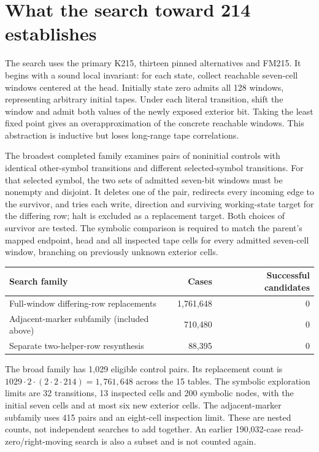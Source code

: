 \documentclass[11pt,a4paper]{article}
\begin{document}


\section{What the search toward 214 establishes}
\label{sec:search}

The search uses the primary K215, thirteen pinned alternatives and FM215.
It begins with a sound local invariant: for each state, collect reachable
seven-cell windows centered at the head. Initially state zero admits all
128 windows, representing arbitrary initial tapes. Under each literal
transition, shift the window and admit both values of the newly exposed
exterior bit. Taking the least fixed point gives an overapproximation of
the concrete reachable windows. This abstraction is inductive but loses
long-range tape correlations.

The broadest completed family examines pairs of noninitial controls with
identical other-symbol transitions and different selected-symbol
transitions. For that selected symbol, the two sets of admitted seven-bit
windows must be nonempty and disjoint. It deletes one of the pair,
redirects every incoming edge to the survivor, and tries each write,
direction and surviving working-state target for the differing row;
halt is excluded as a replacement target. Both choices of survivor are
tested. The symbolic comparison is required to match the parent's
mapped endpoint, head and all inspected tape cells for every admitted
seven-cell window, branching on previously unknown exterior cells.

\begin{center}
\begin{tabular}{lrr}
\toprule
Search family & Cases & Successful candidates\\
\midrule
Full-window differing-row replacements & 1,761,648 & 0\\
Adjacent-marker subfamily (included above) & 710,480 & 0\\
Separate two-helper-row resynthesis & 88,395 & 0\\
\bottomrule
\end{tabular}
\end{center}

The broad family has 1,029 eligible control pairs. Its replacement count
is $1029\cdot2\cdot(2\cdot2\cdot214)=1{,}761{,}648$ across the 15
tables. The symbolic exploration limits are 32 transitions, 13 inspected
cells and 200 symbolic nodes, with the initial seven cells and at most six
new exterior cells. The adjacent-marker subfamily uses 415 pairs and an
eight-cell inspection limit. These are nested counts, not independent
searches to add together. An earlier 190,032-case read-zero/right-moving
search is also a subset and is not counted again.
\end{document}
